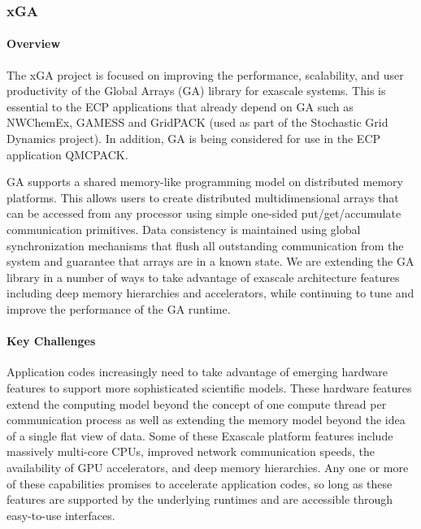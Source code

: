\subsubsection{xGA} 

\paragraph{Overview} 

The xGA project is focused on improving the performance, scalability,
and user productivity of the Global Arrays (GA) library for exascale
systems.  This is essential to the ECP applications that already depend
on GA such as NWChemEx\cite{xGA_NWCHEM}, GAMESS\cite{xGA_GAMESS} and
GridPACK\cite{xGA_GRIDPACK} (used as part of the Stochastic Grid
Dynamics project).  In addition, GA is being considered for use in the
ECP application QMCPACK\cite{xGA_QMCPACK}.

GA supports a shared memory-like programming model on distributed memory
platforms.  This allows users to create distributed multidimensional
arrays that can be accessed from any processor using simple one-sided
put/get/accumulate communication primitives. Data consistency is maintained
using global synchronization mechanisms that flush all outstanding communication
from the system and guarantee that arrays are in a known state.
We are extending the GA library in a number of ways to take advantage of
exascale architecture features including
deep memory hierarchies and accelerators, while continuing to tune and
improve the performance of the GA runtime.

\paragraph{Key  Challenges}

Application codes increasingly need to take advantage of emerging
hardware features to support more sophisticated scientific models. These
hardware features extend the computing model beyond the concept of one compute
thread per communication process as well as extending the memory model beyond
the idea of a single flat view of data. Some of these Exascale platform features
include massively multi-core CPUs, improved network communication speeds, the
availability of GPU accelerators, and deep memory hierarchies. Any one or more
of these capabilities promises to accelerate application codes, so long as these
features are supported by the underlying runtimes and are accessible
through easy-to-use interfaces.

